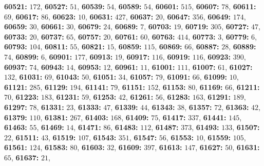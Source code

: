 \textsf{\bfseries 60521:} $172$, \textsf{\bfseries 60527:} $51$, \textsf{\bfseries 60539:} $54$, \textsf{\bfseries 60589:} $54$, \textsf{\bfseries 60601:} $515$, \textsf{\bfseries 60607:} $78$, \textsf{\bfseries 60611:} $69$, \textsf{\bfseries 60617:} $86$, \textsf{\bfseries 60623:} $10$, \textsf{\bfseries 60631:} $427$, \textsf{\bfseries 60637:} $20$, \textsf{\bfseries 60647:} $356$, \textsf{\bfseries 60649:} $174$, \textsf{\bfseries 60659:} $30$, \textsf{\bfseries 60661:} $30$, \textsf{\bfseries 60679:} $24$, \textsf{\bfseries 60689:} $7$, \textsf{\bfseries 60703:} $19$, \textsf{\bfseries 60719:} $305$, \textsf{\bfseries 60727:} $47$, \textsf{\bfseries 60733:} $20$, \textsf{\bfseries 60737:} $65$, \textsf{\bfseries 60757:} $20$, \textsf{\bfseries 60761:} $60$, \textsf{\bfseries 60763:} $414$, \textsf{\bfseries 60773:} $3$, \textsf{\bfseries 60779:} $6$, \textsf{\bfseries 60793:} $104$, \textsf{\bfseries 60811:} $55$, \textsf{\bfseries 60821:} $15$, \textsf{\bfseries 60859:} $115$, \textsf{\bfseries 60869:} $66$, \textsf{\bfseries 60887:} $28$, \textsf{\bfseries 60889:} $74$, \textsf{\bfseries 60899:} $6$, \textsf{\bfseries 60901:} $177$, \textsf{\bfseries 60913:} $19$, \textsf{\bfseries 60917:} $116$, \textsf{\bfseries 60919:} $116$, \textsf{\bfseries 60923:} $390$, \textsf{\bfseries 60937:} $74$, \textsf{\bfseries 60943:} $14$, \textsf{\bfseries 60953:} $12$, \textsf{\bfseries 60961:} $11$, \textsf{\bfseries 61001:} $111$, \textsf{\bfseries 61007:} $61$, \textsf{\bfseries 61027:} $132$, \textsf{\bfseries 61031:} $69$, \textsf{\bfseries 61043:} $50$, \textsf{\bfseries 61051:} $34$, \textsf{\bfseries 61057:} $79$, \textsf{\bfseries 61091:} $66$, \textsf{\bfseries 61099:} $10$, \textsf{\bfseries 61121:} $285$, \textsf{\bfseries 61129:} $194$, \textsf{\bfseries 61141:} $79$, \textsf{\bfseries 61151:} $152$, \textsf{\bfseries 61153:} $80$, \textsf{\bfseries 61169:} $66$, \textsf{\bfseries 61211:} $70$, \textsf{\bfseries 61223:} $183$, \textsf{\bfseries 61231:} $59$, \textsf{\bfseries 61253:} $42$, \textsf{\bfseries 61261:} $56$, \textsf{\bfseries 61283:} $163$, \textsf{\bfseries 61291:} $189$, \textsf{\bfseries 61297:} $78$, \textsf{\bfseries 61331:} $23$, \textsf{\bfseries 61333:} $47$, \textsf{\bfseries 61339:} $44$, \textsf{\bfseries 61343:} $38$, \textsf{\bfseries 61357:} $72$, \textsf{\bfseries 61363:} $42$, \textsf{\bfseries 61379:} $110$, \textsf{\bfseries 61381:} $267$, \textsf{\bfseries 61403:} $168$, \textsf{\bfseries 61409:} $75$, \textsf{\bfseries 61417:} $337$, \textsf{\bfseries 61441:} $145$, \textsf{\bfseries 61463:} $55$, \textsf{\bfseries 61469:} $14$, \textsf{\bfseries 61471:} $86$, \textsf{\bfseries 61483:} $112$, \textsf{\bfseries 61487:} $373$, \textsf{\bfseries 61493:} $133$, \textsf{\bfseries 61507:} $22$, \textsf{\bfseries 61511:} $43$, \textsf{\bfseries 61519:} $107$, \textsf{\bfseries 61543:} $351$, \textsf{\bfseries 61547:} $56$, \textsf{\bfseries 61553:} $10$, \textsf{\bfseries 61559:} $105$, \textsf{\bfseries 61561:} $124$, \textsf{\bfseries 61583:} $80$, \textsf{\bfseries 61603:} $32$, \textsf{\bfseries 61609:} $397$, \textsf{\bfseries 61613:} $147$, \textsf{\bfseries 61627:} $50$, \textsf{\bfseries 61631:} $65$, \textsf{\bfseries 61637:} $21$, 
